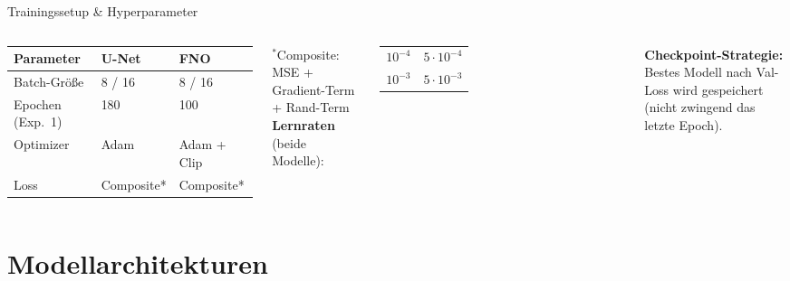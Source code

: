\documentclass[aspectratio=169]{beamer}
\begin{document}
\begin{frame}{Trainingssetup \& Hyperparameter}
  \begin{columns}[T]
      \renewcommand{\arraystretch}{1.4}
      \begin{tabular}{lll}
        \toprule
        Parameter & U-Net & FNO \\
        \midrule
        Batch-Größe     & 8 / 16  & 8 / 16 \\
        Epochen (Exp.~1) & 180    & 100 \\
        Optimizer       & Adam    & Adam + Clip \\
        Loss            & Composite* & Composite* \\
        \bottomrule
      \end{tabular}
      \vspace{6pt}

      \small
      ${}^*$Composite: MSE + Gradient-Term + Rand-Term\\

      \textbf{Lernraten} (beide Modelle):
      \vspace{6pt}

      \renewcommand{\arraystretch}{1.4}
      \begin{tabular}{cc}
        \toprule
        $10^{-4}$ & $5\cdot10^{-4}$ \\
        $10^{-3}$ & $5\cdot10^{-3}$ \\
        \bottomrule
      \end{tabular}
      \vspace{10pt}

      \textbf{Checkpoint-Strategie:}\\
      Bestes Modell nach Val-Loss wird gespeichert
      (nicht zwingend das letzte Epoch).
  \end{columns}
\end{frame}

\section{Modellarchitekturen}
\end{document}
